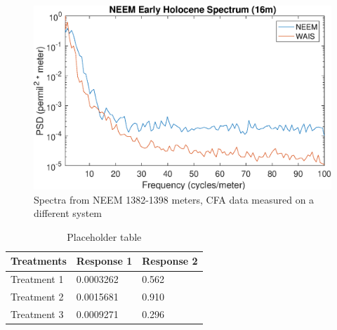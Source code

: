 \documentclass[draft, jgrga]{AGUTeX}
\begin{document}
\begin{figure}
\includegraphics[width=.9\linewidth]{NEEMspec.eps}
\caption{Spectra from NEEM 1382-1398 meters, CFA data measured on a different system}\label{NEEMspec}
\end{figure}

\begin{table}
\caption{Placeholder table}\label{sampletable}
\begin{tabular}{l l l}
\hline
\textbf{Treatments} & \textbf{Response 1} & \textbf{Response 2}\\
\hline
Treatment 1 & 0.0003262 & 0.562 \\
Treatment 2 & 0.0015681 & 0.910 \\
Treatment 3 & 0.0009271 & 0.296 \\
\hline
\end{tabular}
\end{table}
\end{document}
